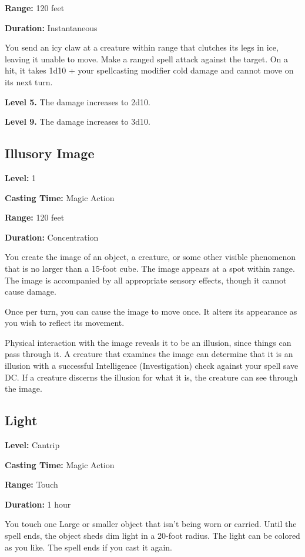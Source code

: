 \documentclass[12pt,letterpaper,twocolumn,openany,nodeprecatedcode,bg=none]{dndbook}
\begin{document}
\textbf{Range:} 120 feet

\textbf{Duration:} Instantaneous

You send an icy claw at a creature within range that clutches its legs
in ice, leaving it unable to move. Make a ranged spell attack against
the target. On a hit, it takes 1d10 + your spellcasting modifier cold
damage and cannot move on its next turn.

\textbf{Level 5.} The damage increases to 2d10.

\textbf{Level 9.} The damage increases to 3d10.

\subsection{Illusory Image}\label{illusory-image}

\textbf{Level:} 1

\textbf{Casting Time:} Magic Action

\textbf{Range:} 120 feet

\textbf{Duration:} Concentration

You create the image of an object, a creature, or some other visible
phenomenon that is no larger than a 15-foot cube. The image appears at a
spot within range. The image is accompanied by all appropriate sensory
effects, though it cannot cause damage.

Once per turn, you can cause the image to move once. It alters its
appearance as you wish to reflect its movement.

Physical interaction with the image reveals it to be an illusion, since
things can pass through it. A creature that examines the image can
determine that it is an illusion with a successful Intelligence
(Investigation) check against your spell save DC. If a creature discerns
the illusion for what it is, the creature can see through the image.

\subsection{Light}\label{light}

\textbf{Level:} Cantrip

\textbf{Casting Time:} Magic Action

\textbf{Range:} Touch

\textbf{Duration:} 1 hour

You touch one Large or smaller object that isn't being worn or carried.
Until the spell ends, the object sheds dim light in a 20-foot radius.
The light can be colored as you like. The spell ends if you cast it
again.
\end{document}
